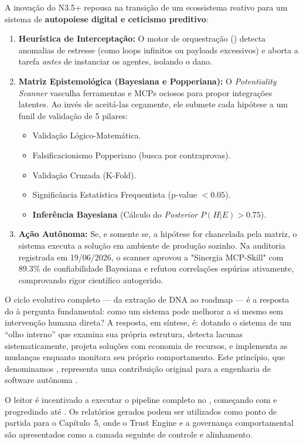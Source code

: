 A inovação do N3.5+ repousa na transição de um ecossistema reativo para um sistema de \textbf{autopoiese digital e ceticismo preditivo}:
\begin{enumerate}
\item \textbf{Heurística de Interceptação:} O motor de orquestração () detecta anomalias de estresse (como loops infinitos ou payloads excessivos) e aborta a tarefa \emph{antes} de instanciar os agentes, isolando o dano.
\item \textbf{Matriz Epistemológica (Bayesiana e Popperiana):} O \emph{Potentiality Scanner} vasculha ferramentas e MCPs ociosos para propor integrações latentes. Ao invés de aceitá-las cegamente, ele submete cada hipótese a um funil de validação de 5 pilares:
  \begin{itemize}
  \item Validação Lógico-Matemática.
  \item Falsificacionismo Popperiano (busca por contraprovas).
  \item Validação Cruzada (K-Fold).
  \item Significância Estatística Frequentista (p-value $< 0.05$).
  \item \textbf{Inferência Bayesiana} (Cálculo do \emph{Posterior} $P(H|E) > 0.75$).
  \end{itemize}
\item \textbf{Ação Autônoma:} Se, e somente se, a hipótese for chancelada pela matriz, o sistema executa a solução em ambiente de produção sozinho. Na auditoria registrada em 19/06/2026, o scanner aprovou a "Sinergia MCP-Skill" com 89.3\% de confiabilidade Bayesiana e refutou correlações espúrias ativamente, comprovando rigor científico autogerido.
\end{enumerate}

O ciclo evolutivo completo --- da extração de DNA ao roadmap --- é a
resposta do \opencodeeco{} à pergunta fundamental: como um sistema pode
melhorar a si mesmo sem intervenção humana direta? A resposta, em síntese,
é: dotando o sistema de um ``olho interno'' que examina sua própria
estrutura, detecta lacunas sistematicamente, projeta soluções com
economia de recursos, e implementa as mudanças enquanto monitora seu
próprio comportamento. Este princípio, que denominamos , representa uma contribuição original para a
engenharia de software autônoma \cite{opencode2026ecosystem, laranjeira2026opencode}.

\begin{observacao}
O leitor é incentivado a executar o pipeline completo no
\opencodeeco{}, começando com  e progredindo
até . Os relatórios gerados podem
ser utilizados como ponto de partida para o Capítulo~5, onde o Trust
Engine e a governança comportamental são apresentados como a camada
seguinte de controle e alinhamento.
\end{observacao}

